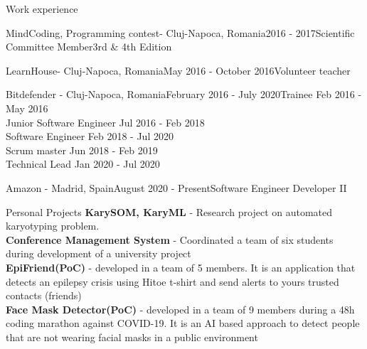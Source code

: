 \documentclass{resume} %
\begin{document}
\begin{rSection}{Work experience}

    \begin{rSubsection}{MindCoding, Programming contest- Cluj-Napoca, Romania}{2016 - 2017}{Scientific Committee Member}{3rd \& 4th Edition}
    \end{rSubsection}
    \begin{rSubsection}{LearnHouse- Cluj-Napoca, Romania}{May 2016 - October 2016}{Volunteer teacher}{}
    \end{rSubsection}
    \begin{rSubsection}{Bitdefender - Cluj-Napoca, Romania}{February 2016 - July 2020}{Trainee \hfill Feb 2016 - May 2016}{\\Junior Software Engineer \hfill Jul 2016 - Feb 2018\\Software Engineer \hfill Feb 2018 - Jul 2020\\Scrum master \hfill Jun 2018 - Feb 2019\\Technical Lead \hfill Jan 2020 - Jul 2020}{}
    \end{rSubsection}
    \begin{rSubsection}{Amazon - Madrid, Spain}{August 2020 - Present}{Software Engineer Developer II}{}
    \end{rSubsection}

\end{rSection}
\begin{rSection}{Personal Projects}
{\bf KarySOM, KaryML} - Research project on automated karyotyping problem.\\
{\bf Conference Management System} - Coordinated a team of six students during development of a university project\\
{\bf EpiFriend(PoC)} - developed in a team of 5 members. It is an application that detects an epilepsy crisis using Hitoe t-shirt and send alerts to yours trusted contacts (friends)\\
{\bf Face Mask Detector(PoC)} - developed in a team of 9 members during a 48h coding marathon against COVID-19. It is an AI based approach to detect people that are not wearing facial masks in a public environment
\end{rSection}
\end{document}
